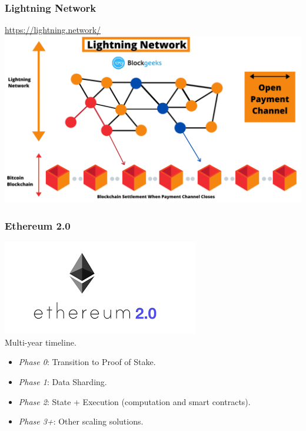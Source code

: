 \documentclass{beamer}
\begin{document}
\begin{frame}
  \frametitle{Lightning Network}
  \url{https://lightning.network/}
 \centering
	\includegraphics[scale=0.3]{LN}
\end{frame}
\begin{frame}
  \frametitle{Ethereum 2.0}
 \centering
	\includegraphics[scale=0.35]{eth} \\
	
  Multi-year timeline. 
 	\begin{itemize}
 		\item \emph{Phase 0}: Transition to Proof of Stake.
 		\item \emph{Phase 1}: Data Sharding.
 		\item \emph{Phase 2}: State + Execution (computation and smart contracts).
 		\item \emph{Phase 3+}: Other scaling solutions.
 	\end{itemize}
\end{frame}
\end{document}
